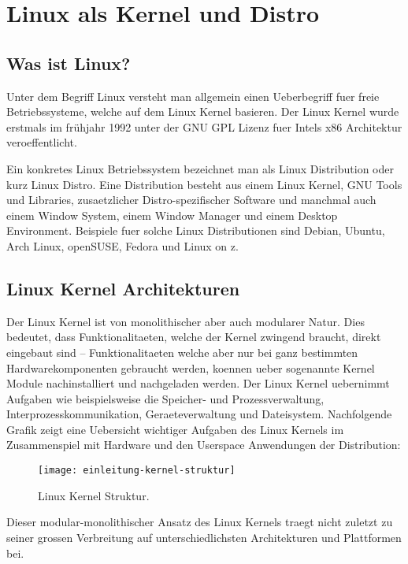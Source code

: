 \chapter{Linux als Kernel und Distro}
\label{cha:Linux}

\section{Was ist Linux?}

Unter dem Begriff Linux versteht man allgemein einen Ueberbegriff fuer freie Betriebssysteme, welche auf dem Linux Kernel basieren.\cite{LinuxWiki}
Der Linux Kernel wurde erstmals im frühjahr 1992 unter der GNU GPL Lizenz fuer Intels x86 Architektur veroeffentlicht.

Ein konkretes Linux Betriebssystem bezeichnet man als Linux Distribution oder kurz Linux Distro. Eine Distribution besteht aus einem Linux Kernel, GNU Tools und Libraries, zusaetzlicher Distro-spezifischer Software und manchmal auch einem Window System, einem Window Manager und einem Desktop Environment. Beispiele fuer solche Linux Distributionen sind Debian, Ubuntu, Arch Linux, openSUSE, Fedora und Linux on z.\cite{LinuxDistroWiki}

\section{Linux Kernel Architekturen}

Der Linux Kernel ist von monolithischer aber auch modularer Natur. Dies bedeutet, dass Funktionalitaeten, welche der Kernel zwingend braucht, direkt eingebaut sind -- Funktionalitaeten welche aber nur bei ganz bestimmten Hardwarekomponenten gebraucht werden, koennen ueber sogenannte Kernel Module nachinstalliert und nachgeladen werden.
Der Linux Kernel uebernimmt Aufgaben wie beispielsweise die Speicher- und Prozessverwaltung, Interprozesskommunikation, Geraeteverwaltung und Dateisystem.
Nachfolgende Grafik zeigt eine Uebersicht wichtiger Aufgaben des Linux Kernels im Zusammenspiel mit Hardware und den Userspace Anwendungen der Distribution:

\begin{figure}[h!]
\centering
\texttt{[image: einleitung-kernel-struktur]}
\caption{Linux Kernel Struktur\cite{KernelStruktur}.}
\label{fig:KernelStruktur}
\end{figure}

\newpage

Dieser modular-monolithischer Ansatz des Linux Kernels traegt nicht zuletzt zu seiner grossen Verbreitung auf unterschiedlichsten Architekturen und Plattformen bei.

